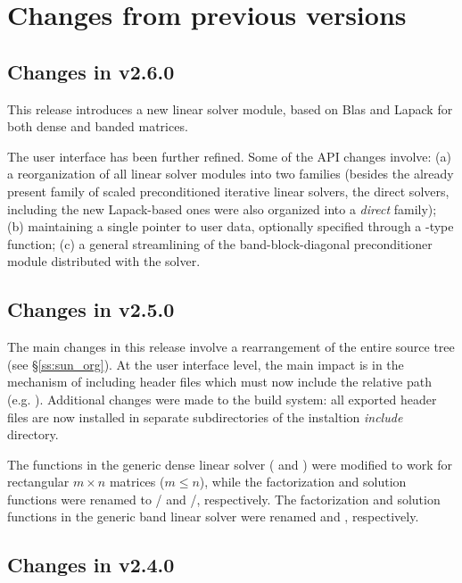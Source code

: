 \section{Changes from previous versions}

\subsection*{Changes in v2.6.0}

This release introduces a new linear solver module, based on Blas and Lapack 
for both dense and banded matrices.

The user interface has been further refined. Some of the API changes involve:
(a) a reorganization of all linear solver modules into two families (besides 
the already present family of scaled preconditioned iterative linear solvers,
the direct solvers, including the new Lapack-based ones were also organized 
into a {\em direct} family); (b) maintaining a single pointer to user data,
optionally specified through a -type function; (c) a general 
streamlining of the band-block-diagonal preconditioner module distributed 
with the solver.

\subsection*{Changes in v2.5.0}

The main changes in this release involve a rearrangement of the entire 
{\sundials} source tree (see \S\ref{ss:sun_org}). At the user interface 
level, the main impact is in the mechanism of including {\sundials} header
files which must now include the relative path (e.g. ).
Additional changes were made to the build system: all exported header files are
now installed in separate subdirectories of the instaltion {\em include} directory.

The functions in the generic dense linear solver ( and
) were modified to work for rectangular $m \times n$
matrices ($m \le n$), while the factorization and solution functions were
renamed to / and /, 
respectively.
The factorization and solution functions in the generic band linear solver were 
renamed  and , respectively.

\subsection*{Changes in v2.4.0}

